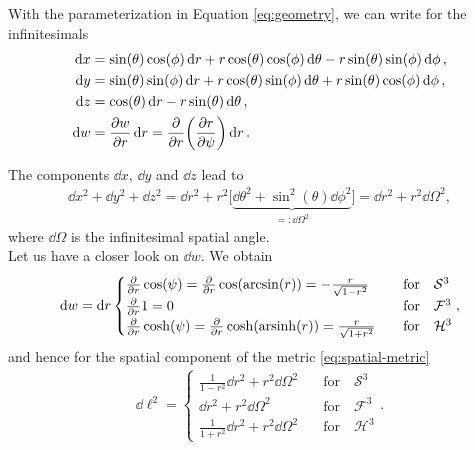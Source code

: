 \noindent With the parameterization in Equation \eqref{eq:geometry}, we can write for the infinitesimals 
\begin{align*}
    \dd{x} &= \sin(\theta) \cos(\phi) \dd{r} + r \cos(\theta) \cos(\phi) \dd{\theta} - r \sin(\theta) \sin(\phi) \dd{\phi}, \nonumber \\
    \dd{y} &= \sin(\theta) \sin(\phi) \dd{r} + r \cos(\theta) \sin(\phi) \dd{\theta} + r \sin(\theta) \cos(\phi) \dd{\phi}, \nonumber \\
    \dd{z} &= \cos(\theta) \dd{r} - r \sin(\theta) \dd{\theta}, \nonumber \\
    \dd{w} &= \pdv{w}{r} \dd{r} = \pdv{}{r} \biggl(\pdv{r}{\psi}\biggr) \dd{r} \nonumber.
\end{align*}

\noindent The components $\dd{x}$, $\dd{y}$ and $\dd{z}$ lead to 
\begin{align*}
    \dd{x}^2 + \dd{y}^2 + \dd{z}^2 = \dd{r}^2 + r^2 \bigl[ \underbrace{\dd{\theta}^2 + \sin^2(\theta) \dd{\phi}^2}_{=: \dd{\Omega}^2} \bigr] = \dd{r}^2 + r^2 \dd{\Omega}^2,
\end{align*}
where $\dd{\Omega}$ is the infinitesimal spatial angle. \\
Let us have a closer look on $\dd{w}$. We obtain
\begin{align}
    \dd{w} = \dd{r} \begin{cases} 
                        \pdv{}{r} \cos(\psi) = \pdv{}{r} \cos(\arcsin(r)) = -\frac{r}{\sqrt{1 - r^2}} \quad &\text{for} \quad \mathcal{S}^{3} \\
                        \pdv{}{r} 1 = 0 \quad &\text{for} \quad \mathcal{F}^{3} \\
                        \pdv{}{r} \cosh(\psi) = \pdv{}{r} \cosh(\operatorname{arsinh}(r)) = \frac{r}{\sqrt{1 + r^2}} \quad &\text{for} \quad \mathcal{H}^{3}
                    \end{cases}, 
\end{align}
and hence for the spatial component of the metric \eqref{eq:spatial-metric}
\begin{align}
    \dd{\ell}^2 = \begin{cases}
                      \frac{1}{1 - r^2} \dd{r}^2 + r^2 \dd{\Omega}^2 \quad &\text{for} \quad \mathcal{S}^{3} \\
                      \dd{r}^2 + r^2 \dd{\Omega}^2 \quad &\text{for} \quad \mathcal{F}^{3} \\
                      \frac{1}{1 + r^2} \dd{r}^2 + r^2 \dd{\Omega}^2 \quad &\text{for} \quad \mathcal{H}^{3}
                  \end{cases}. \label{eq:spatial-metric-cases}
\end{align}
